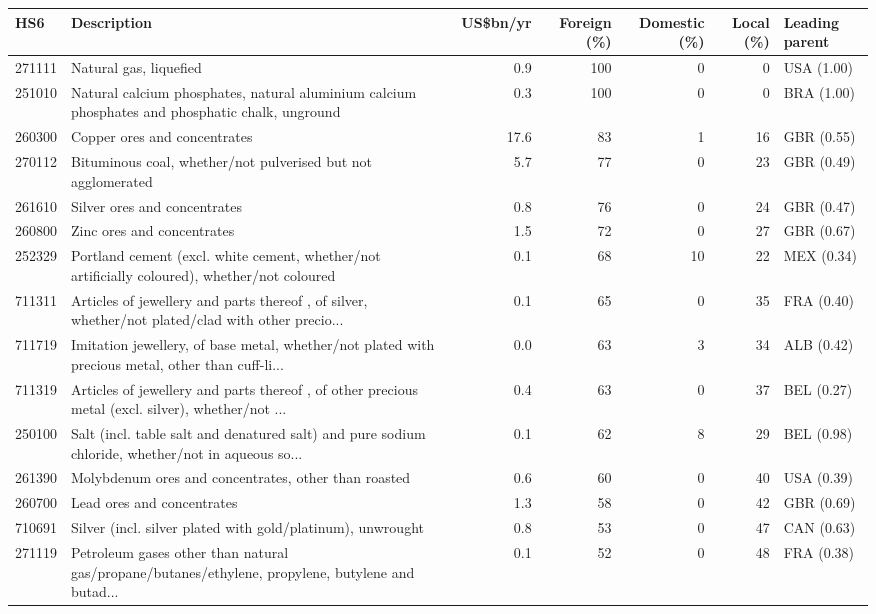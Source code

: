 \begin{tabular}{@{}l p{6.4cm} r r r r l@{}}
\toprule
HS6 & Description & US\$bn/yr & Foreign (\%) & Domestic (\%) & Local (\%) & Leading parent \\
\midrule
271111 & Natural gas, liquefied & 0.9 & 100 & 0 & 0 & USA (1.00) \\
251010 & Natural calcium phosphates, natural aluminium calcium phosphates and phosphatic chalk, unground & 0.3 & 100 & 0 & 0 & BRA (1.00) \\
260300 & Copper ores and concentrates & 17.6 & 83 & 1 & 16 & GBR (0.55) \\
270112 & Bituminous coal, whether/\allowbreak{}not pulverised but not agglomerated & 5.7 & 77 & 0 & 23 & GBR (0.49) \\
261610 & Silver ores and concentrates & 0.8 & 76 & 0 & 24 & GBR (0.47) \\
260800 & Zinc ores and concentrates & 1.5 & 72 & 0 & 27 & GBR (0.67) \\
252329 & Portland cement (excl. white cement, whether/\allowbreak{}not artificially coloured), whether/\allowbreak{}not coloured & 0.1 & 68 & 10 & 22 & MEX (0.34) \\
711311 & Articles of jewellery and parts thereof , of silver, whether/\allowbreak{}not plated/\allowbreak{}clad with other precio... & 0.1 & 65 & 0 & 35 & FRA (0.40) \\
711719 & Imitation jewellery, of base metal, whether/\allowbreak{}not plated with precious metal, other than cuff-li... & 0.0 & 63 & 3 & 34 & ALB (0.42) \\
711319 & Articles of jewellery and parts thereof , of other precious metal (excl. silver), whether/\allowbreak{}not ... & 0.4 & 63 & 0 & 37 & BEL (0.27) \\
250100 & Salt (incl. table salt and denatured salt) and pure sodium chloride, whether/\allowbreak{}not in aqueous so... & 0.1 & 62 & 8 & 29 & BEL (0.98) \\
261390 & Molybdenum ores and concentrates, other than roasted & 0.6 & 60 & 0 & 40 & USA (0.39) \\
260700 & Lead ores and concentrates & 1.3 & 58 & 0 & 42 & GBR (0.69) \\
710691 & Silver (incl. silver plated with gold/\allowbreak{}platinum), unwrought & 0.8 & 53 & 0 & 47 & CAN (0.63) \\
271119 & Petroleum gases other than natural gas/\allowbreak{}propane/\allowbreak{}butanes/\allowbreak{}ethylene, propylene, butylene and butad... & 0.1 & 52 & 0 & 48 & FRA (0.38) \\

\end{tabular}

